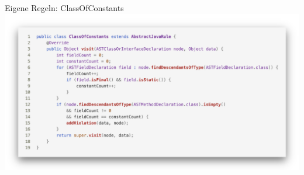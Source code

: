 \documentclass{sdqbeamer}
\begin{document}
\begin{frame}[fragile]{Eigene Regeln: ClassOfConstants}
    \vspace{-0.5cm}
    \hspace{-0.7cm}
    \includegraphics[scale=0.22]{logos/CustomRuleClassOfConstants.png}
\end{frame}
\end{document}
